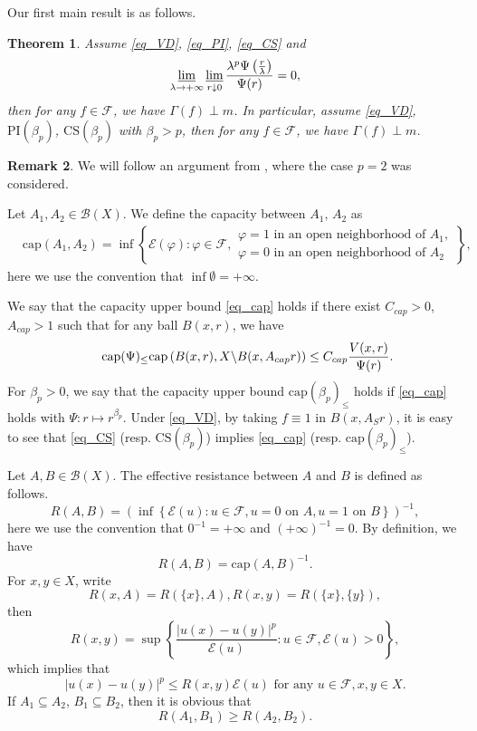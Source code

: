 \documentclass[11pt,a4paper]{article}
\numberwithin{equation}{section}
\theoremstyle{plain}
\newtheorem{theorem}{Theorem}[section]
\theoremstyle{definition}
\newtheorem{remark}[theorem]{Remark}
\begin{document}
Our first main result is as follows.

\begin{theorem}\label{thm_singular}
Assume \ref{eq_VD}, \ref{eq_PI}, \ref{eq_CS} and
\begin{equation}\label{eq_Psi_singular}
\varliminf_{\lambda\to+\infty}\varliminf_{r\downarrow0}\frac{\lambda^p\Psi\left(\frac{r}{\lambda}\right)}{\Psi(r)}=0,
\end{equation}
then for any $f\in\mathcal{F}$, we have $\Gamma(f)\perp m$. In particular, assume \ref{eq_VD}, \hyperlink{eq_PIbeta}{$\text{PI}(\beta_p)$}, \hyperlink{eq_CSbeta}{$\text{CS}(\beta_p)$} with $\beta_p>p$, then for any $f\in\mathcal{F}$, we have $\Gamma(f)\perp m$.
\end{theorem}

\begin{remark}
We will follow an argument from \cite{KM20}, where the case $p=2$ was considered.
\end{remark}

Let $A_1,A_2\in\mathcal{B}(X)$. We define the capacity between $A_1$, $A_2$ as
\begin{align*}
&\mathrm{cap}(A_1,A_2)=\inf\left\{\mathcal{E}(\varphi):\varphi\in\mathcal{F},
\begin{array}{l}
\varphi=1\text{ in an open neighborhood of }A_1,\\
\varphi=0\text{ in an open neighborhood of }A_2
\end{array}
\right\},
\end{align*}
here we use the convention that $\inf\emptyset=+\infty$.

We say that the capacity upper bound \ref{eq_cap} holds if there exist $C_{cap}>0$, $A_{cap}>1$ such that for any ball $B(x,r)$, we have
\begin{equation*}\label{eq_cap}\tag*{$\text{cap}(\Psi)_{\le}$}
\mathrm{cap}\left(B(x,r),X\backslash B(x,A_{cap}r)\right)\le C_{cap} \frac{V(x,r)}{\Psi(r)}.
\end{equation*}
For $\beta_p>0$, we say that the capacity upper bound \hypertarget{eq_capbeta}{$\text{cap}(\beta_p)_{\le}$} holds if \ref{eq_cap} holds with $\Psi:r\mapsto r^{\beta_p}$. Under \ref{eq_VD}, by taking $f\equiv1$ in $B(x,A_Sr)$, it is easy to see that \ref{eq_CS} (resp. \hyperlink{eq_CSbeta}{$\text{CS}(\beta_p)$}) implies \ref{eq_cap} (resp. \hyperlink{eq_capbeta}{$\text{cap}(\beta_p)_{\le}$}).

Let $A,B\in\mathcal{B}(X)$. The effective resistance between $A$ and $B$ is defined as follows.
$$R(A,B)=\left(\inf\left\{\mathcal{E}(u):u\in\mathcal{F},u=0\text{ on }A,u=1\text{ on }B\right\}\right)^{-1},$$
here we use the convention that $0^{-1}=+\infty$  and $(+\infty)^{-1}=0$. By definition, we have
$$R(A,B)=\mathrm{cap}(A,B)^{-1}.$$
For $x,y\in X$, write
$$R(x,A)=R(\{x\},A),R(x,y)=R(\{x\},\{y\}),$$
then
$$R(x,y)=\sup\left\{\frac{|u(x)-u(y)|^p}{\mathcal{E}(u)}:u\in\mathcal{F},\mathcal{E}(u)>0\right\},$$
which implies that
$$|u(x)-u(y)|^p\le R(x,y)\mathcal{E}(u)\text{ for any }u\in\mathcal{F},x,y\in X.$$
If $A_1\subseteq A_2$, $B_1\subseteq B_2$, then it is obvious that
$$R(A_1,B_1)\ge R(A_2,B_2).$$
\end{document}
